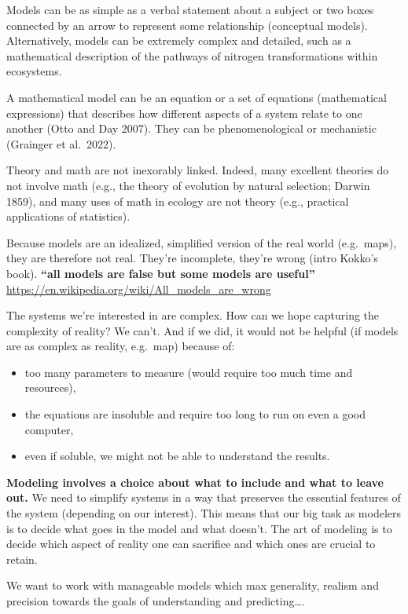 \documentclass[
]{book}
\providecommand{\tightlist}{%
  \setlength{\itemsep}{0pt}\setlength{\parskip}{0pt}}
\theoremstyle{definition}
\theoremstyle{definition}
\theoremstyle{definition}
\theoremstyle{definition}
\theoremstyle{remark}
\begin{document}
Models can be as simple as a verbal statement about a subject or two boxes connected by an arrow to represent some relationship (conceptual models). Alternatively, models can be extremely complex and detailed, such as a mathematical description of the pathways of nitrogen transformations within ecosystems.

A mathematical model can be an equation or a set of equations (mathematical expressions) that describes how different aspects of a system relate to one another (Otto and Day 2007). They can be phenomenological or mechanistic (Grainger et al.~2022).

Theory and math are not inexorably linked. Indeed, many excellent theories do not involve math (e.g., the theory of evolution by natural selection; Darwin 1859), and many uses of math in ecology are not theory (e.g., practical applications of statistics).

Because models are an idealized, simplified version of the real world (e.g.~maps), they are therefore not real. They're incomplete, they're wrong (intro Kokko's book).
\textbf{``all models are false but some models are useful''}
\url{https://en.wikipedia.org/wiki/All_models_are_wrong}

The systems we're interested in are complex. How can we hope capturing the complexity of reality? We can't.
And if we did, it would not be helpful (if models are as complex as reality, e.g.~map) because of:

\begin{itemize}
\tightlist
\item
  too many parameters to measure (would require too much time and resources),
\item
  the equations are insoluble and require too long to run on even a good computer,
\item
  even if soluble, we might not be able to understand the results.
\end{itemize}

\textbf{Modeling involves a choice about what to include and what to leave out.}
We need to simplify systems in a way that preserves the essential features of the system (depending on our interest). This means that our big task as modelers is to decide what goes in the model and what doesn't. The art of modeling is to decide which aspect of reality one can sacrifice and which ones are crucial to retain.

We want to work with manageable models which max generality, realism and precision towards the goals of understanding and predicting\ldots.
\end{document}

